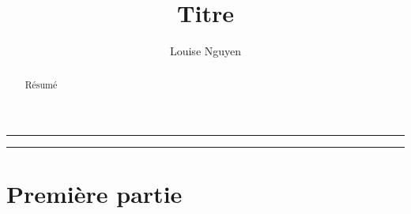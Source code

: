 \documentclass[a4paper, french]{paper}
\title{Titre}
\author{Louise Nguyen} %
\date{}
\theoremstyle{nonumberplain}
\begin{document}
\maketitle
\hrule
\smalltableofcontents


\begin{abstract}
    Résumé
\end{abstract}
\hrule\bigskip


\section{Première partie}

\end{document}
